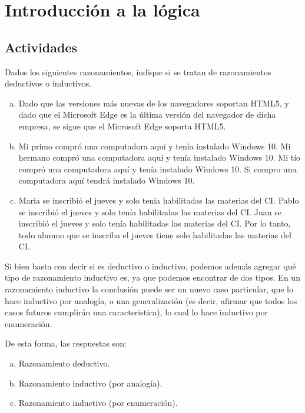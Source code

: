 
\chapter{Introducción a la lógica}
\label{chap:logica}

\section{Actividades}
\label{chap:logica:sec:actividades}

\begin{exercise}
    Dados los siguientes razonamientos, indique si se tratan de razonamientos
    deductivos o inductivos.

    \begin{enumerate}[a)]
      \item
        Dado que las versiones más nuevas de los navegadores soportan HTML5, y
        dado que el Microsoft Edge es la última versión del navegador de dicha
        empresa, se sigue que el Microsoft Edge soporta HTML5.

      \item
        Mi primo compró una computadora aquí y tenía instalado Windows 10. Mi
        hermano compró una computadora aquí y tenía instalado Windows 10. Mi tío
        compró una computadora aquí y tenía instalado Windows 10. Si compro una
        computadora aquí tendrá instalado Windows 10.

      \item
        Maria se inscribió el jueves y solo tenía habilitadas las materias del
        CI. Pablo se inscribió el jueves y solo tenía habilitadas las materias
        del CI. Juan se inscribió el jueves y solo tenía habilitadas las
        materias del CI. Por lo tanto, todo alumno que se inscriba el jueves
        tiene solo habilitadas las materias del CI.
    \end{enumerate}
\end{exercise}

\begin{solution}
    Si bien basta con decir si es deductivo o inductivo, podemos además agregar qué
    tipo de razonamiento inductivo es, ya que podemos encontrar de dos tipos. En un
    razonamiento inductivo la conclusión puede ser un nuevo caso particular, que lo
    hace inductivo por analogía, o una generalización (es decir, afirmar que todos
    los casos futuros cumplirán una caracteristica), lo cual lo hace inductivo por
    enumeración.

    De esta forma, las respuestas son:

    \begin{enumerate}[a)]
        \item Razonamiento deductivo.
        \item Razonamiento inductivo (por analogía).
        \item Razonamiento inductivo (por enumeración).
    \end{enumerate}
\end{solution}

